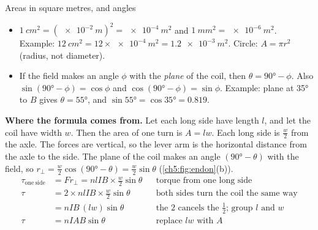 \begin{toolkit}{Areas in square metres, and angles}
\begin{itemize}
  \item $\qty{1}{cm^2} = (\qty{e-2}{m})^2 = \qty{e-4}{m^2}$ and
        $\qty{1}{mm^2} = \qty{e-6}{m^2}$. Example: $\qty{12}{cm^2} = 12 \times
        \qty{e-4}{m^2} = \qty{1.2e-3}{m^2}$. Circle: $A = \pi r^2$ (radius, not diameter).
  \item If the field makes an angle $\phi$ with the \emph{plane} of the coil, then
        $\theta = \ang{90} - \phi$. Also $\sin(\ang{90} - \phi) = \cos\phi$ and
        $\cos(\ang{90} - \phi) = \sin\phi$. Example: plane at \ang{35} to $B$ gives
        $\theta = \ang{55}$, and $\sin\ang{55} = \cos\ang{35} = 0.819$.
\end{itemize}
\end{toolkit}

\textbf{Where the formula comes from.} Let each long side have length $l$, and let the
coil have width $w$. Then the area of one turn is $A = lw$. Each long side is
$\tfrac{w}{2}$ from the axle. The forces are vertical, so the lever arm is the
horizontal distance from the axle to the side. The plane of the coil makes an angle
$(\ang{90} - \theta)$ with the field, so
$r_\perp = \tfrac{w}{2}\cos(\ang{90} - \theta) = \tfrac{w}{2}\sin\theta$
(\cref{ch5:fig:endon}(b)).
\begin{align*}
  \tau_\mathrm{one\ side} &= F r_\perp = nlIB \times \tfrac{w}{2}\sin\theta
    && \text{torque from one long side}\\
  \tau &= 2 \times nlIB \times \tfrac{w}{2}\sin\theta
    && \text{both sides turn the coil the same way}\\
  &= nIB\,(lw)\sin\theta
    && \text{the 2 cancels the $\tfrac{1}{2}$; group $l$ and $w$}\\
  \tau &= nIAB\sin\theta && \text{replace $lw$ with $A$}
\end{align*}

